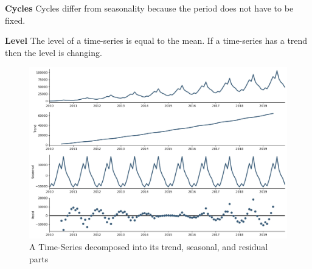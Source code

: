 \textbf{Cycles}
Cycles differ from seasonality because the period does not have to be fixed.


\textbf{Level}
The level of a time-series is equal to the mean. If a time-series has a trend
then the level is changing.



\begin{figure}[h!]
  \centering
  \caption{A Time-Series decomposed into its trend, seasonal, and residual parts}
  \label{fig:example-time-series-decomposed}
  \includegraphics[width=\textwidth]{./figs/illustrations/time-series_example-decomposed.png}
  \hfill
\end{figure}